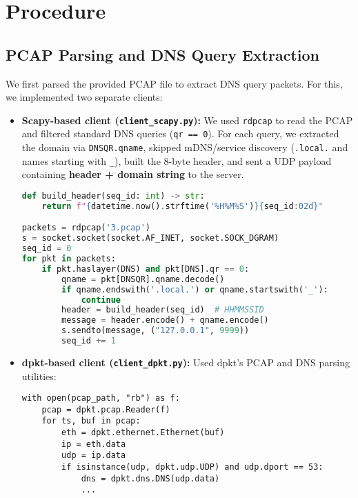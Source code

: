 \documentclass[10pt,a4paper]{report}
\newcommand{\code}[1]{\texttt{#1}}
\begin{document}
\section{Procedure}

\subsection{PCAP Parsing and DNS Query Extraction}
We first parsed the provided PCAP file to extract DNS query packets. For this, we implemented two separate clients:
\begin{itemize}
    \item \textbf{Scapy-based client (\texttt{client\_scapy.py}):}
    We used \code{rdpcap} to read the PCAP and filtered standard DNS queries (\code{qr == 0}). For each query, we extracted the domain via \code{DNSQR.qname}, skipped mDNS/service discovery (\code{.local.} and names starting with \code{\_}), built the 8-byte header, and sent a UDP payload containing \textbf{header + domain string} to the server.
    \begin{lstlisting}[language=Python, caption={Filtering DNS queries and sending header+domain}, label={lst:scapy-client}]
def build_header(seq_id: int) -> str:
    return f"{datetime.now().strftime('%H%M%S')}{seq_id:02d}"

packets = rdpcap('3.pcap')
s = socket.socket(socket.AF_INET, socket.SOCK_DGRAM)
seq_id = 0
for pkt in packets:
    if pkt.haslayer(DNS) and pkt[DNS].qr == 0:
        qname = pkt[DNSQR].qname.decode()
        if qname.endswith('.local.') or qname.startswith('_'):
            continue
        header = build_header(seq_id)  # HHMMSSID
        message = header.encode() + qname.encode()
        s.sendto(message, ("127.0.0.1", 9999))
        seq_id += 1
    \end{lstlisting}
    
    \item \textbf{dpkt-based client (\texttt{client\_dpkt.py}):}
    Used dpkt's PCAP and DNS parsing utilities:
    \begin{lstlisting}
with open(pcap_path, "rb") as f:
    pcap = dpkt.pcap.Reader(f)
    for ts, buf in pcap:
        eth = dpkt.ethernet.Ethernet(buf)
        ip = eth.data
        udp = ip.data
        if isinstance(udp, dpkt.udp.UDP) and udp.dport == 53:
            dns = dpkt.dns.DNS(udp.data)
            ...
    \end{lstlisting}
\end{itemize}

\end{document}
